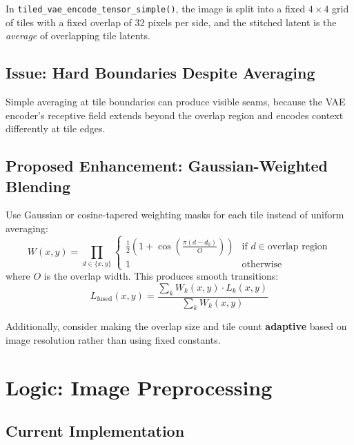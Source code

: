 \documentclass[11pt,a4paper]{article}
\newcommand{\fn}[1]{\texttt{#1}}
\begin{document}
In \fn{tiled\_vae\_encode\_tensor\_simple()}, the image is split into a fixed $4\!\times\!4$ grid of tiles with a fixed overlap of 32 pixels per side, and the stitched latent is the \emph{average} of overlapping tile latents.

\subsection{Issue: Hard Boundaries Despite Averaging}

Simple averaging at tile boundaries can produce visible seams, because the VAE encoder's receptive field extends beyond the overlap region and encodes context differently at tile edges.

\subsection{Proposed Enhancement: Gaussian-Weighted Blending}

Use Gaussian or cosine-tapered weighting masks for each tile instead of uniform averaging:
\begin{equation}
    W(x, y) = \prod_{d \in \{x, y\}} \begin{cases}
        \frac{1}{2}\left(1 + \cos\left(\frac{\pi (d - d_0)}{O}\right)\right) & \text{if } d \in \text{overlap region} \\
        1 & \text{otherwise}
    \end{cases}
\end{equation}
where $O$ is the overlap width.
This produces smooth transitions:
\begin{equation}
    L_{\text{fused}}(x,y) = \frac{\sum_k W_k(x,y) \cdot L_k(x,y)}{\sum_k W_k(x,y)}
\end{equation}

Additionally, consider making the overlap size and tile count \textbf{adaptive} based on image resolution rather than using fixed constants.

\section{Logic: Image Preprocessing}

\subsection{Current Implementation}
\end{document}

